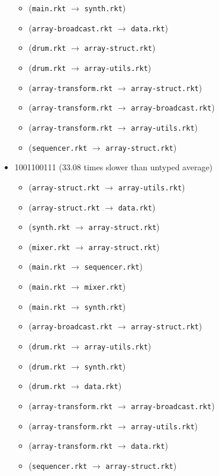 \documentclass{article}
\newcommand{\mono}[1]{\texttt{#1}}
\begin{document}
\begin{itemize}
\begin{itemize}
  \item (\mono{main.rkt} $\rightarrow$ \mono{synth.rkt})
  \item (\mono{array-broadcast.rkt} $\rightarrow$ \mono{data.rkt})
  \item (\mono{drum.rkt} $\rightarrow$ \mono{array-struct.rkt})
  \item (\mono{drum.rkt} $\rightarrow$ \mono{array-utils.rkt})
  \item (\mono{array-transform.rkt} $\rightarrow$ \mono{array-struct.rkt})
  \item (\mono{array-transform.rkt} $\rightarrow$ \mono{array-broadcast.rkt})
  \item (\mono{array-transform.rkt} $\rightarrow$ \mono{array-utils.rkt})
  \item (\mono{sequencer.rkt} $\rightarrow$ \mono{array-struct.rkt})
  \end{itemize}
\item 1001100111 (33.08 times slower than untyped average)
  \begin{itemize}
  \item (\mono{array-struct.rkt} $\rightarrow$ \mono{array-utils.rkt})
  \item (\mono{array-struct.rkt} $\rightarrow$ \mono{data.rkt})
  \item (\mono{synth.rkt} $\rightarrow$ \mono{array-struct.rkt})
  \item (\mono{mixer.rkt} $\rightarrow$ \mono{array-struct.rkt})
  \item (\mono{main.rkt} $\rightarrow$ \mono{sequencer.rkt})
  \item (\mono{main.rkt} $\rightarrow$ \mono{mixer.rkt})
  \item (\mono{main.rkt} $\rightarrow$ \mono{synth.rkt})
  \item (\mono{array-broadcast.rkt} $\rightarrow$ \mono{array-struct.rkt})
  \item (\mono{drum.rkt} $\rightarrow$ \mono{array-utils.rkt})
  \item (\mono{drum.rkt} $\rightarrow$ \mono{synth.rkt})
  \item (\mono{drum.rkt} $\rightarrow$ \mono{data.rkt})
  \item (\mono{array-transform.rkt} $\rightarrow$ \mono{array-broadcast.rkt})
  \item (\mono{array-transform.rkt} $\rightarrow$ \mono{array-utils.rkt})
  \item (\mono{array-transform.rkt} $\rightarrow$ \mono{data.rkt})
  \item (\mono{sequencer.rkt} $\rightarrow$ \mono{array-struct.rkt})

\end{itemize}
\end{itemize}
\end{document}
